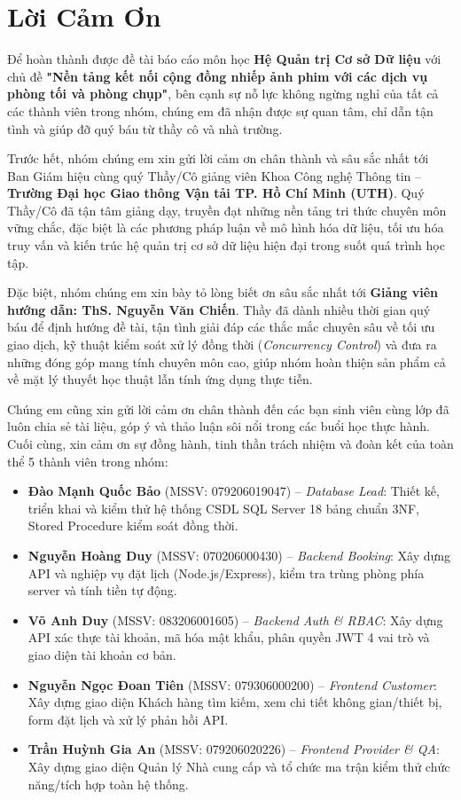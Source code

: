 \chapter*{Lời Cảm Ơn}

Để hoàn thành được đề tài báo cáo môn học \textbf{Hệ Quản trị Cơ sở Dữ liệu} với chủ đề \textbf{"Nền tảng kết nối cộng đồng nhiếp ảnh phim với các dịch vụ phòng tối và phòng chụp"}, bên cạnh sự nỗ lực không ngừng nghỉ của tất cả các thành viên trong nhóm, chúng em đã nhận được sự quan tâm, chỉ dẫn tận tình và giúp đỡ quý báu từ thầy cô và nhà trường.

Trước hết, nhóm chúng em xin gửi lời cảm ơn chân thành và sâu sắc nhất tới Ban Giám hiệu cùng quý Thầy/Cô giảng viên Khoa Công nghệ Thông tin -- \textbf{Trường Đại học Giao thông Vận tải TP. Hồ Chí Minh (UTH)}. Quý Thầy/Cô đã tận tâm giảng dạy, truyền đạt những nền tảng tri thức chuyên môn vững chắc, đặc biệt là các phương pháp luận về mô hình hóa dữ liệu, tối ưu hóa truy vấn và kiến trúc hệ quản trị cơ sở dữ liệu hiện đại trong suốt quá trình học tập.

Đặc biệt, nhóm chúng em xin bày tỏ lòng biết ơn sâu sắc nhất tới \textbf{Giảng viên hướng dẫn: ThS. Nguyễn Văn Chiến}. Thầy đã dành nhiều thời gian quý báu để định hướng đề tài, tận tình giải đáp các thắc mắc chuyên sâu về tối ưu giao dịch, kỹ thuật kiểm soát xử lý đồng thời (\textit{Concurrency Control}) và đưa ra những đóng góp mang tính chuyên môn cao, giúp nhóm hoàn thiện sản phẩm cả về mặt lý thuyết học thuật lẫn tính ứng dụng thực tiễn.

Chúng em cũng xin gửi lời cảm ơn chân thành đến các bạn sinh viên cùng lớp đã luôn chia sẻ tài liệu, góp ý và thảo luận sôi nổi trong các buổi học thực hành. Cuối cùng, xin cảm ơn sự đồng hành, tinh thần trách nhiệm và đoàn kết của toàn thể 5 thành viên trong nhóm:

\begin{itemize}[leftmargin=2em]
    \item \textbf{Đào Mạnh Quốc Bảo} (MSSV: 079206019047) -- \textit{Database Lead}: Thiết kế, triển khai và kiểm thử hệ thống CSDL SQL Server 18 bảng chuẩn 3NF, Stored Procedure kiểm soát đồng thời.
    \item \textbf{Nguyễn Hoàng Duy} (MSSV: 070206000430) -- \textit{Backend Booking}: Xây dựng API và nghiệp vụ đặt lịch (Node.js/Express), kiểm tra trùng phòng phía server và tính tiền tự động.
    \item \textbf{Võ Anh Duy} (MSSV: 083206001605) -- \textit{Backend Auth \& RBAC}: Xây dựng API xác thực tài khoản, mã hóa mật khẩu, phân quyền JWT 4 vai trò và giao diện tài khoản cơ bản.
    \item \textbf{Nguyễn Ngọc Đoan Tiên} (MSSV: 079306000200) -- \textit{Frontend Customer}: Xây dựng giao diện Khách hàng tìm kiếm, xem chi tiết không gian/thiết bị, form đặt lịch và xử lý phản hồi API.
    \item \textbf{Trần Huỳnh Gia An} (MSSV: 079206020226) -- \textit{Frontend Provider \& QA}: Xây dựng giao diện Quản lý Nhà cung cấp và tổ chức ma trận kiểm thử chức năng/tích hợp toàn hệ thống.
\end{itemize}

